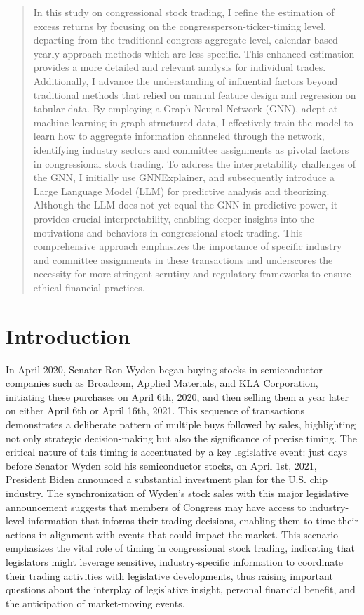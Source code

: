 \documentclass[15pt,letterpaper]{article}
\newcommand\spacingset[1]{\renewcommand{\baselinestretch}
{#1}\small\normalsize}
\begin{document}
\begin{abstract}
In this study on congressional stock trading, I refine the estimation of excess returns by focusing on the congressperson-ticker-timing level, departing from the traditional congress-aggregate level, calendar-based yearly approach methods which are less specific. This enhanced estimation provides a more detailed and relevant analysis for individual trades. Additionally, I advance the understanding of influential factors beyond traditional methods that relied on manual feature design and regression on tabular data. By employing a Graph Neural Network (GNN), adept at machine learning in graph-structured data, I effectively train the model to learn how to aggregate information channeled through the network, identifying industry sectors and committee assignments as pivotal factors in congressional stock trading. To address the interpretability challenges of the GNN, I initially use GNNExplainer, and subsequently introduce a Large Language Model (LLM) for predictive analysis and theorizing. Although the LLM does not yet equal the GNN in predictive power, it provides crucial interpretability, enabling deeper insights into the motivations and behaviors in congressional stock trading. This comprehensive approach emphasizes the importance of specific industry and committee assignments in these transactions and underscores the necessity for more stringent scrutiny and regulatory frameworks to ensure ethical financial practices.


\singlespacing %
\end{abstract}
\clearpage

\section{Introduction}
\spacingset{2} %

In April 2020, Senator Ron Wyden began buying stocks in semiconductor companies such as Broadcom, Applied Materials, and KLA Corporation, initiating these purchases on April 6th, 2020, and then selling them a year later on either April 6th or April 16th, 2021. This sequence of transactions demonstrates a deliberate pattern of multiple buys followed by sales, highlighting not only strategic decision-making but also the significance of precise timing. The critical nature of this timing is accentuated by a key legislative event: just days before Senator Wyden sold his semiconductor stocks, on April 1st, 2021, President Biden announced a substantial investment plan for the U.S. chip industry. The synchronization of Wyden's stock sales with this major legislative announcement suggests that members of Congress may have access to industry-level information that informs their trading decisions, enabling them to time their actions in alignment with events that could impact the market. This scenario emphasizes the vital role of timing in congressional stock trading, indicating that legislators might leverage sensitive, industry-specific information to coordinate their trading activities with legislative developments, thus raising important questions about the interplay of legislative insight, personal financial benefit, and the anticipation of market-moving events.
\end{document}

